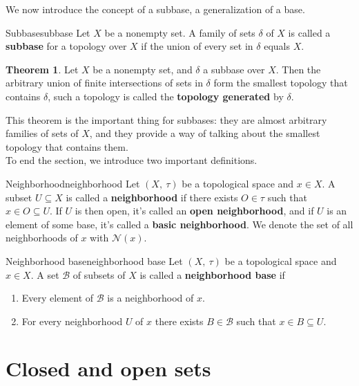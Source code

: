 \documentclass[a4paper]{book}
\theoremstyle{definition}
\newtheorem{theorem}{Theorem}[section]
\theoremstyle{ejemplo}
\theoremstyle{demostracion}
\begin{document}
We now introduce the concept of a subbase, a generalization of a base.

\begin{define}{Subbase}{subbase}
	Let $X$ be a nonempty set. A family of sets $\delta$ of $X$ is called a \textbf{subbase} for a topology over $X$ if the union of every set in $\delta$ equals $X$.
\end{define}

\begin{theorem}
	Let $X$ be a nonempty set, and $\delta$ a subbase over $X$. Then the arbitrary union of finite intersections of sets in $\delta$ form the smallest topology that contains $\delta$, such a topology is called the \textbf{topology generated} by $\delta$.
\end{theorem}

This theorem is the important thing for subbases: they are almost arbitrary families of sets of $X$, and they provide a way of talking about the smallest topology that contains them.\\ 

To end the section, we introduce two important definitions.

\begin{define}{Neighborhood}{neighborhood}
	Let $(X,\ \tau)$ be a topological space and $x \in X$. A subset $U \subseteq X$ is called a \textbf{neighborhood} if there exists $O \in \tau$ such that $x \in O \subseteq U$. If $U$ is then open, it's called an \textbf{open neighborhood}, and if $U$ is an element of some base, it's called a \textbf{basic neighborhood}. We denote the set of all neighborhoods of $x$ with $\mathcal{N}(x)$.
\end{define}

\begin{define}{Neighborhood base}{neighborhood base}
	Let $(X,\ \tau)$ be a topological space and $x \in X$. A set $\mathcal{B}$ of subsets of $X$ is called a \textbf{neighborhood base} if
	\begin{enumerate}
		\item
		Every element of $\mathcal{B}$ is a neighborhood of $x$.
		
		\item
		For every neighborhood $U$ of $x$ there exists $B \in \mathcal{B}$ such that $x \in B \subseteq U$.
	\end{enumerate}
\end{define}

\section{Closed and open sets}
\end{document}
